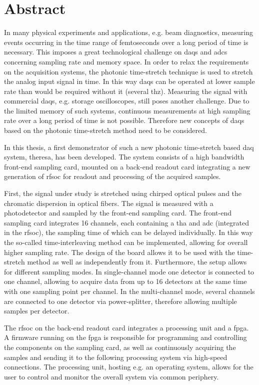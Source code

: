 \chapter*{Abstract}
In many physical experiments and applications, e.g. beam diagnostics, measuring events occurring in the time range of femtoseconds over a long period of time is necessary. 
This imposes a great technological challenge on \glspl{daq} and \glspl{adc} concerning sampling rate and memory space.
In order to relax the requirements on the acquisition systems, the photonic time-stretch technique is used to stretch the analog input signal in time.
In this way \glspl{daq} can be operated at lower sample rate than would be required without it (several \gls{thz}). 
Measuring the signal with commercial \glspl{daq}, e.g. storage oscilloscopes, still poses another challenge.
Due to the limited memory of such systems, continuous measurements at high sampling rate over a long period of time is not possible.
Therefore new concepts of \glspl{daq} based on the photonic time-stretch method need to be considered.

In this thesis, a first demonstrator of such a new photonic time-stretch based \gls{daq} system, \gls{theresa}, has been developed. 
The system consists of a high bandwidth front-end sampling card, mounted on a back-end readout card integrating a new generation of \gls{rfsoc} for readout and processing of the acquired samples.

First, the signal under study is stretched using chirped optical pulses and the chromatic dispersion in optical fibers.
The signal is measured with a photodetector and sampled by the front-end sampling card.
The front-end sampling card integrates 16 channels, each containing a \gls{tha} and \gls{adc} (integrated in the \gls{rfsoc}), the sampling time of which can be delayed individually. 
In this way the so-called time-interleaving method can be implemented, allowing for overall higher sampling rate.
The design of the board allows it to be used with the time-stretch method as well as independently from it.
Furthermore, the setup allows for different sampling modes.
In single-channel mode one detector is connected to one channel, allowing to acquire data from up to 16 detectors at the same time with one sampling point per channel.
In the multi-channel mode, several channels are connected to one detector via power-splitter, therefore allowing multiple samples per detector. %

The \gls{rfsoc} on the back-end readout card integrates a processing unit and a \gls{fpga}. 
A firmware running on the \gls{fpga} is responsible for programming and controlling the components on the sampling card, as well as continuously acquiring the samples and sending it to the following processing system via high-speed connections.
The processing unit, hosting e.g. an operating system, allows for the user to control and monitor the overall system via common periphery.

